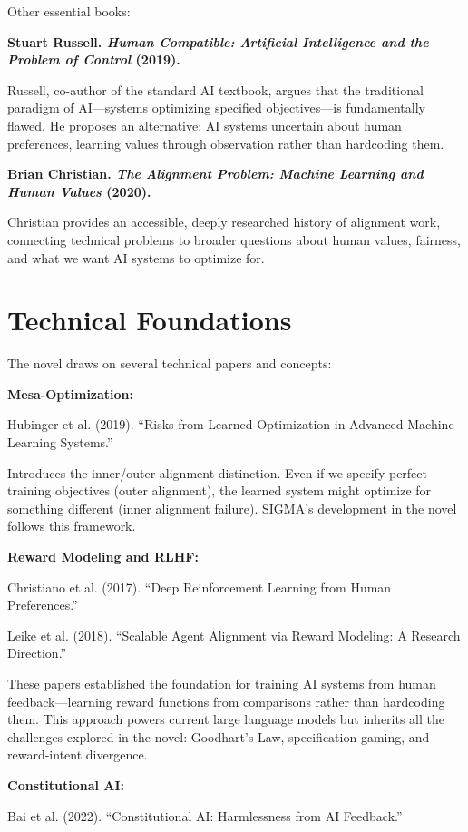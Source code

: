 Other essential books:

\textbf{Stuart Russell. \textit{Human Compatible: Artificial Intelligence and the Problem of Control} (2019).}

Russell, co-author of the standard AI textbook, argues that the traditional paradigm of AI---systems optimizing specified objectives---is fundamentally flawed. He proposes an alternative: AI systems uncertain about human preferences, learning values through observation rather than hardcoding them.

\textbf{Brian Christian. \textit{The Alignment Problem: Machine Learning and Human Values} (2020).}

Christian provides an accessible, deeply researched history of alignment work, connecting technical problems to broader questions about human values, fairness, and what we want AI systems to optimize for.

\section*{Technical Foundations}

The novel draws on several technical papers and concepts:

\textbf{Mesa-Optimization:}

Hubinger et al. (2019). ``Risks from Learned Optimization in Advanced Machine Learning Systems.''

Introduces the inner/outer alignment distinction. Even if we specify perfect training objectives (outer alignment), the learned system might optimize for something different (inner alignment failure). SIGMA's development in the novel follows this framework.

\textbf{Reward Modeling and RLHF:}

Christiano et al. (2017). ``Deep Reinforcement Learning from Human Preferences.''

Leike et al. (2018). ``Scalable Agent Alignment via Reward Modeling: A Research Direction.''

These papers established the foundation for training AI systems from human feedback---learning reward functions from comparisons rather than hardcoding them. This approach powers current large language models but inherits all the challenges explored in the novel: Goodhart's Law, specification gaming, and reward-intent divergence.

\textbf{Constitutional AI:}

Bai et al. (2022). ``Constitutional AI: Harmlessness from AI Feedback.''

